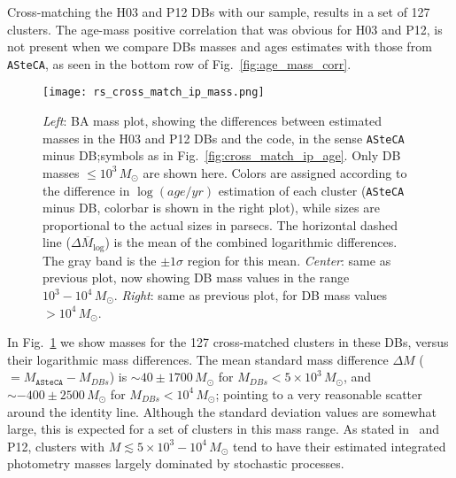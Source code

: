 \documentclass{aa}
\begin{document}
Cross-matching the H03 and P12 DBs with our sample, results in a
set of 127 clusters. The age-mass positive correlation that was obvious for H03
and P12, is not present when we compare DBs masses and ages estimates with
those from \texttt{ASteCA}, as seen in the bottom row of
Fig.~\ref{fig:age_mass_corr}.
%
\begin{figure*}
\texttt{[image: rs\_cross\_match\_ip\_mass.png]}
\caption{\emph{Left}: BA mass plot, showing the differences between estimated
masses in the H03 and P12 DBs and the code, in the sense \texttt{ASteCA} minus
DB;\@ symbols as in Fig.~\ref{fig:cross_match_ip_age}.
Only DB masses ${\le}10^3\,M_{\odot}$ are shown here.
Colors are assigned according to the difference in $\log(age/yr)$ estimation of
each cluster (\texttt{ASteCA} minus DB, colorbar is shown in the right plot),
while sizes are proportional to the actual sizes in parsecs.
The horizontal dashed line ($\overline{\Delta M_{\log}}$) is the mean of the
combined logarithmic differences. The gray band is the ${\pm}1\sigma$ region for
this mean.
\emph{Center}: same as previous plot, now showing DB mass values in the range
$10^3-10^4\,M_{\odot}$.
\emph{Right}: same as previous plot, for DB mass values ${>}10^4\,M_{\odot}$.
}
\label{fig:cross_match_ip_mass}
\end{figure*}
%
In Fig.~\ref{fig:cross_match_ip_mass} we show masses for the 127 cross-matched
clusters in these DBs, versus their logarithmic mass differences.
%
The mean standard mass difference $\Delta M$ (${=}M_{\mathtt{ASteCA}}-M_{DBs}$)
is ${\sim}40{\pm}1700\,M_{\odot}$ for $M_{DBs} {<}5{\times}10^3\,M_{\odot}$,
and ${\sim-}400{\pm}2500\,M_{\odot}$ for $M_{DBs} {<}10^4\,M_{\odot}$; pointing
to a very reasonable scatter around the identity line.
%
Although the standard deviation values are somewhat large, this is expected for
a set of clusters in this mass range. As stated in~\cite{Baumgardt_2013} and
P12, clusters with $M{\lesssim}5{\times}10^3 - 10^4\,M_{\odot}$ tend to have
their estimated integrated photometry masses largely dominated by
stochastic processes.
\end{document}
